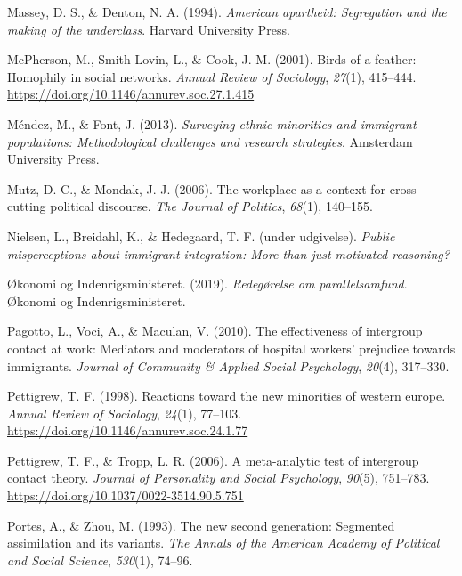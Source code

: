 \documentclass[
]{book}
\newlength{\cslhangindent}
\newenvironment{CSLReferences}[2] %
 {\begin{list}{}{%
  \setlength{\itemindent}{0pt}
  \setlength{\leftmargin}{0pt}
  \setlength{\parsep}{0pt}
  \ifodd #1
   \setlength{\leftmargin}{\cslhangindent}
   \setlength{\itemindent}{-1\cslhangindent}
  \fi
  \setlength{\itemsep}{#2\baselineskip}}}
 {\end{list}}
\begin{document}
\begin{CSLReferences}{1}{0}
Massey, D. S., \& Denton, N. A. (1994). \emph{American apartheid: Segregation and the making of the underclass}. Harvard University Press.

McPherson, M., Smith-Lovin, L., \& Cook, J. M. (2001). Birds of a feather: Homophily in social networks. \emph{Annual Review of Sociology}, \emph{27}(1), 415--444. \url{https://doi.org/10.1146/annurev.soc.27.1.415}

Méndez, M., \& Font, J. (2013). \emph{Surveying ethnic minorities and immigrant populations: Methodological challenges and research strategies}. Amsterdam University Press.

Mutz, D. C., \& Mondak, J. J. (2006). The workplace as a context for cross-cutting political discourse. \emph{The Journal of Politics}, \emph{68}(1), 140--155.

Nielsen, L., Breidahl, K., \& Hedegaard, T. F. (under udgivelse). \emph{Public misperceptions about immigrant integration: More than just motivated reasoning?}

Økonomi og Indenrigsministeret. (2019). \emph{Redegørelse om parallelsamfund}. {Økonomi og Indenrigsministeret}.

Pagotto, L., Voci, A., \& Maculan, V. (2010). The effectiveness of intergroup contact at work: Mediators and moderators of hospital workers' prejudice towards immigrants. \emph{Journal of Community \& Applied Social Psychology}, \emph{20}(4), 317--330.

Pettigrew, T. F. (1998). Reactions toward the new minorities of western europe. \emph{Annual Review of Sociology}, \emph{24}(1), 77--103. \url{https://doi.org/10.1146/annurev.soc.24.1.77}

Pettigrew, T. F., \& Tropp, L. R. (2006). A meta-analytic test of intergroup contact theory. \emph{Journal of Personality and Social Psychology}, \emph{90}(5), 751--783. \url{https://doi.org/10.1037/0022-3514.90.5.751}

Portes, A., \& Zhou, M. (1993). The new second generation: Segmented assimilation and its variants. \emph{The Annals of the American Academy of Political and Social Science}, \emph{530}(1), 74--96.


\end{CSLReferences}
\end{document}
